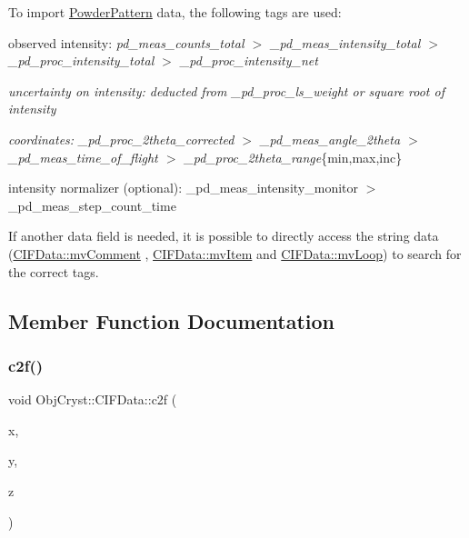 To import \mbox{\hyperlink{class_obj_cryst_1_1_powder_pattern}{Powder\+Pattern}} data, the following tags are used\+:
\begin{DoxyItemize}
\item observed intensity\+: {\itshape pd\+\_\+meas\+\_\+counts\+\_\+total $>$ \+\_\+pd\+\_\+meas\+\_\+intensity\+\_\+total $>$ \+\_\+pd\+\_\+proc\+\_\+intensity\+\_\+total $>$ \+\_\+pd\+\_\+proc\+\_\+intensity\+\_\+net}
\item {\itshape uncertainty on intensity\+: deducted from \+\_\+pd\+\_\+proc\+\_\+ls\+\_\+weight or square root of intensity}
\item {\itshape coordinates\+: \+\_\+pd\+\_\+proc\+\_\+2theta\+\_\+corrected $>$ \+\_\+pd\+\_\+meas\+\_\+angle\+\_\+2theta $>$ \+\_\+pd\+\_\+meas\+\_\+time\+\_\+of\+\_\+flight $>$ \+\_\+pd\+\_\+proc\+\_\+2theta\+\_\+range}\{min,max,inc\}
\item intensity normalizer (optional)\+: \+\_\+pd\+\_\+meas\+\_\+intensity\+\_\+monitor $>$ \+\_\+pd\+\_\+meas\+\_\+step\+\_\+count\+\_\+time
\end{DoxyItemize}

If another data field is needed, it is possible to directly access the string data (\mbox{\hyperlink{class_obj_cryst_1_1_c_i_f_data_a9408fb91caf78518c74b0de53a7c4d38}{C\+I\+F\+Data\+::mv\+Comment}} , \mbox{\hyperlink{class_obj_cryst_1_1_c_i_f_data_a50f7e91571f28b3a3a66675a564496a6}{C\+I\+F\+Data\+::mv\+Item}} and \mbox{\hyperlink{class_obj_cryst_1_1_c_i_f_data_aebd5e242b7771f184f29647527fcab5a}{C\+I\+F\+Data\+::mv\+Loop}}) to search for the correct tags. 

\subsection{Member Function Documentation}
\mbox{\label{class_obj_cryst_1_1_c_i_f_data_a8b83f52c41137c83fdfd6c75d9d83888}} 
\subsubsection{\texorpdfstring{c2f()}{c2f()}}
{\footnotesize\ttfamily void Obj\+Cryst\+::\+C\+I\+F\+Data\+::c2f (\begin{DoxyParamCaption}\item[{R\+E\+AL \&}]{x,  }\item[{R\+E\+AL \&}]{y,  }\item[{R\+E\+AL \&}]{z }\end{DoxyParamCaption})}

